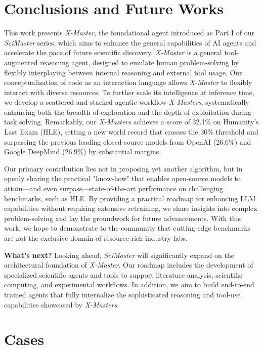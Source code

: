 \documentclass{article}
\begin{document}
\section{Conclusions and Future Works}

This work presents \emph{X-Master}, the foundational agent introduced as Part I of our \emph{SciMaster} series, which aims to enhance the general capabilities of AI agents and accelerate the pace of future scientific discovery. \emph{X-Master} is a general tool-augmented reasoning agent, designed to emulate human problem-solving by flexibly interplaying between internal reasoning and external tool usage.
Our conceptualization of code as an interaction language allows \emph{X-Master} to flexibly interact with diverse resources.
To further scale its intelligence at inference time, we develop a scattered-and-stacked agentic workflow \emph{X-Masters}, systematically enhancing both the breadth of exploration and the depth of exploitation during task solving.
Remarkably, our \emph{X-Masters} achieves a score of 32.1\% on Humanity's Last Exam (HLE), setting a new world record that crosses the 30\% threshold and surpassing the previous leading closed-source models from OpenAI (26.6\%) and Google DeepMind (26.9\%) by substantial margins.

Our primary contribution lies not in proposing yet another algorithm, but in openly sharing the practical "know-how" that enables open-source models to attain—and even surpass—state-of-the-art performance on challenging benchmarks, such as HLE.  By providing a practical roadmap for enhancing LLM capabilities without requiring extensive retraining, we share insights into complex problem-solving and lay the groundwork for future advancements. With this work, we hope to demonstrate to the community that cutting-edge benchmarks are not the exclusive domain of resource-rich industry labs.

\textbf{What's next?}
Looking ahead, \emph{SciMaster} will significantly expand on the architectural foundation of \emph{X-Master}. Our roadmap includes the development of specialized scientific agents and tools to support literature analysis, scientific computing, and experimental workflows. In addition, we aim to build end-to-end trained agents that fully internalize the sophisticated reasoning and tool-use capabilities showcased by \emph{X-Masters}.
{
\small


}

\newpage
\section{Cases}
\end{document}
